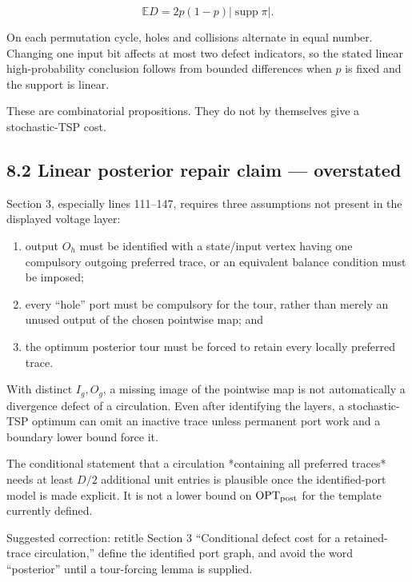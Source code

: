 \documentclass[11pt,a4paper]{article}
\begin{document}
\[
 \mathbb E D=2p(1-p)|\operatorname{supp}\pi|.
\]

On each permutation cycle, holes and collisions alternate in equal number. Changing one input bit affects at most two defect indicators, so the stated linear high-probability conclusion follows from bounded differences when \(p\) is fixed and the support is linear.


These are combinatorial propositions.  They do not by themselves give a stochastic-TSP cost.


\subsection*{8.2 Linear posterior repair claim — overstated}

Section 3, especially lines 111–147, requires three assumptions not present in the displayed voltage layer:


\begin{enumerate}

\item output \(O_h\) must be identified with a state/input vertex having one compulsory outgoing preferred trace, or an equivalent balance condition must be imposed;

\item every “hole” port must be compulsory for the tour, rather than merely an unused output of the chosen pointwise map; and

\item the optimum posterior tour must be forced to retain every locally preferred trace.

\end{enumerate}

With distinct \(I_g,O_g\), a missing image of the pointwise map is not automatically a divergence defect of a circulation.  Even after identifying the layers, a stochastic-TSP optimum can omit an inactive trace unless permanent port work and a boundary lower bound force it.


The conditional statement that a circulation *containing all preferred traces* needs at least \(D/2\) additional unit entries is plausible once the identified-port model is made explicit.  It is not a lower bound on \(\operatorname{OPT}_{\rm post}\) for the template currently defined.


Suggested correction: retitle Section 3 “Conditional defect cost for a retained-trace circulation,” define the identified port graph, and avoid the word “posterior” until a tour-forcing lemma is supplied.
\end{document}

